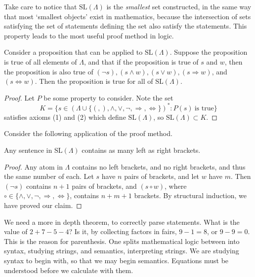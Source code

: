 Take care to notice that $\text{SL}(\Lambda)$ is the {\it smallest} set constructed, in the same way that most `smallest objects' exist in mathematics, because the intersection of sets satisfying the set of statements defining the set also satisfy the statements. This property leads to the most useful proof method in logic.

\begin{theorem}
    Consider a proposition that can be applied to $\text{SL}(\Lambda)$. Suppose the proposition is true of all elements of $\Lambda$, and that if the proposition is true of $s$ and $w$, then the proposition is also true of $(\neg s), (s \wedge w), (s \vee w), (s \Rightarrow w)$, and $(s \Leftrightarrow w)$. Then the proposition is true for all of $\text{SL}(\Lambda)$.
\end{theorem}
\begin{proof}
    Let $P$ be some property to consider. Note the set
    \[ K = \{ s \in (\Lambda \cup \{ (, ), \wedge, \vee, \neg, \Rightarrow, \Leftrightarrow \})^* : P(s)\ \text{is true} \} \]
    satisfies axioms (1) and (2) which define $\text{SL}(\Lambda)$, so $\text{SL}(\Lambda) \subset K$.
\end{proof}

Consider the following application of the proof method.

\begin{theorem}
    Any sentence in $\text{SL}(\Lambda)$ contains as many left as right brackets.
\end{theorem}
\begin{proof}
    Any atom in $\Lambda$ contains no left brackets, and no right brackets, and thus the same number of each. Let $s$ have $n$ pairs of brackets, and let $w$ have $m$. Then $(\neg s)$ contains $n + 1$ pairs of brackets, and $(s \circ w)$, where $\circ \in \{ \wedge, \vee, \neg, \Rightarrow, \Leftrightarrow \}$, contains $n + m + 1$ brackets. By structural induction, we have proved our claim.
\end{proof}

We need a more in depth theorem, to correctly parse statements. What is the value of $2 + 7 - 5 - 4$? Is it, by collecting factors in fairs, $9 - 1 = 8$, or $9 - 9 = 0$. This is the reason for parenthesis. One splits mathematical logic between into syntax, studying strings, and semantics, interpreting strings. We are studying syntax to begin with, so that we may begin semantics. Equations must be understood before we calculate with them.

